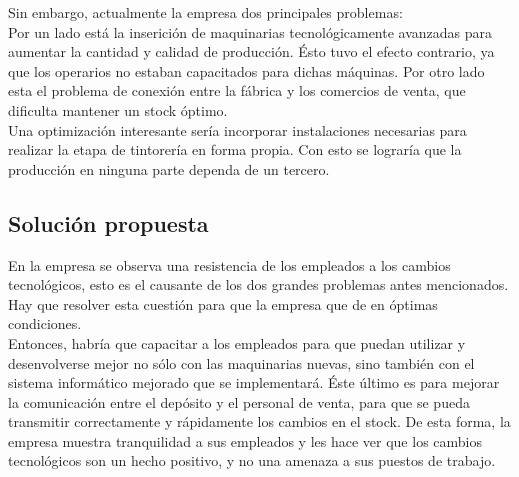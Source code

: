 \documentclass[a4paper,12pt,titlepage]{article}
\begin{document}
	Sin embargo, actualmente la empresa dos principales problemas:\\
	
	Por un lado est\'a la inserici\'on de maquinarias tecnol\'ogicamente avanzadas para aumentar la cantidad y calidad de producci\'on. \'Esto tuvo el efecto contrario, ya que los operarios no estaban capacitados para dichas m\'aquinas. Por otro lado esta el problema de conexi\'on entre la f\'abrica y los comercios de venta, que dificulta mantener un stock \'optimo.\\
	
	Una optimizaci\'on interesante ser\'ia incorporar instalaciones necesarias para realizar la etapa de tintorer\'ia en forma propia. Con esto se lograr\'ia que la producci\'on en ninguna parte dependa de un tercero.


	\subsection{Soluci\'on propuesta}
	En la empresa se observa una resistencia de los empleados a los cambios tecnol\'ogicos, esto es el causante de los dos grandes problemas antes mencionados. Hay que resolver esta cuesti\'on para que la empresa que de en \'optimas condiciones.\\

	Entonces, habr\'ia que capacitar a los empleados para que puedan utilizar y desenvolverse mejor no s\'olo con las maquinarias nuevas, sino tambi\'en con el sistema inform\'atico mejorado que se implementar\'a. \'Este \'ultimo es para mejorar la comunicaci\'on entre el dep\'osito y el personal de venta, para que se pueda transmitir correctamente y r\'apidamente los cambios en el stock. De esta forma, la empresa muestra tranquilidad a sus empleados y les hace ver que los cambios tecnol\'ogicos son un hecho positivo, y no una amenaza a sus puestos de trabajo. 
\end{document}
